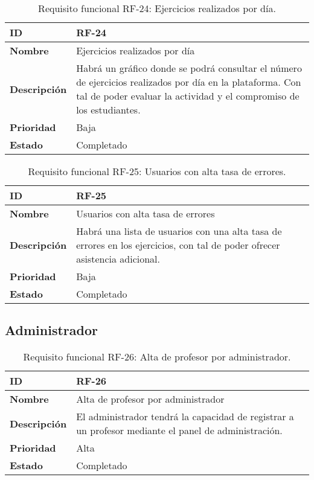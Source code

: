 \begin{table}[H]
    \centering
    \begin{tabular}{|l|p{9.5cm}|}
        \hline
        \textbf{ID} & RF-24 \\
        \hline
        \textbf{Nombre} & Ejercicios realizados por día \\
        \hline
        \textbf{Descripción} & Habrá un gráfico donde se podrá consultar el número de ejercicios realizados por día en la plataforma. Con tal de poder evaluar la actividad y el compromiso de los estudiantes. \\
        \hline
        \textbf{Prioridad} & Baja \\
        \hline
        \textbf{Estado} & Completado \\
        \hline
    \end{tabular}
    \caption{Requisito funcional RF-24: Ejercicios realizados por día.}
    \label{table:req-RF00N}
\end{table}

\begin{table}[H]
    \centering
    \begin{tabular}{|l|p{9.5cm}|}
        \hline
        \textbf{ID} & RF-25 \\
        \hline
        \textbf{Nombre} & Usuarios con alta tasa de errores \\
        \hline
        \textbf{Descripción} & Habrá una lista de usuarios con una alta tasa de errores en los ejercicios, con tal de poder ofrecer asistencia adicional. \\
        \hline
        \textbf{Prioridad} & Baja \\
        \hline
        \textbf{Estado} & Completado \\
        \hline
    \end{tabular}
    \caption{Requisito funcional RF-25: Usuarios con alta tasa de errores.}
    \label{table:req-RF00M}
\end{table}

\subsection{Administrador}

\begin{table}[H]
    \centering
    \begin{tabular}{|l|p{9.5cm}|}
        \hline
        \textbf{ID} & RF-26 \\
        \hline
        \textbf{Nombre} & Alta de profesor por administrador \\
        \hline
        \textbf{Descripción} & El administrador tendrá la capacidad de registrar a un profesor mediante el panel de administración. \\
        \hline
        \textbf{Prioridad} & Alta \\
        \hline
        \textbf{Estado} & Completado \\
        \hline
    \end{tabular}
    \caption{Requisito funcional RF-26: Alta de profesor por administrador.}
    \label{table:req-RF0010}
\end{table}
        
